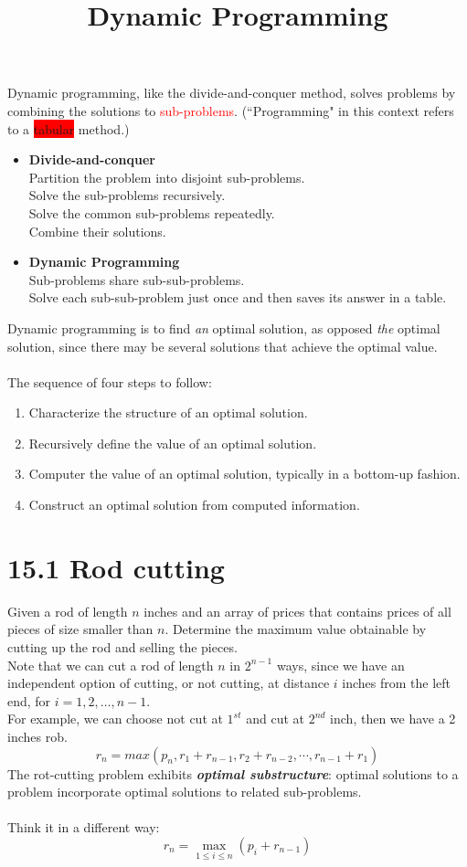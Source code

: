 \documentclass[a4paper]{article}
\title{Dynamic Programming}
\begin{document}
\maketitle

Dynamic programming, like the divide-and-conquer method, solves problems by combining the solutions to \textcolor{red}{sub-problems}. (``Programming" in this context refers to a \colorbox{red}{tabular} method.)\\
\begin{itemize}
    \item \textbf{Divide-and-conquer}\\
    Partition the problem into disjoint sub-problems.\\
    Solve the sub-problems recursively.\\
    Solve the common sub-problems repeatedly.\\
    Combine their solutions.
    \item \textbf{Dynamic Programming}\\
    Sub-problems share sub-sub-problems.\\
    Solve each sub-sub-problem just once and then saves its answer in a table.
\end{itemize}
Dynamic programming is to find \textit{an} optimal solution, as opposed \textit{the} optimal solution, since there may be several solutions that achieve the optimal value. 
\\
\\
The sequence of four steps to follow:
\begin{enumerate}
    \item Characterize the structure of an optimal solution.
    \item Recursively define the value of an optimal solution.
    \item Computer the value of an optimal solution, typically in a bottom-up fashion.
    \item Construct an optimal solution from computed information.
\end{enumerate}

\section*{15.1 Rod cutting}
Given a rod of length $n$ inches and an array of prices that contains prices of all pieces of size smaller than $n$. Determine the maximum value obtainable by cutting up the rod and selling the pieces.\\
Note that we can cut a rod of length $n$ in $2^{n-1}$ ways, since we have an independent option of cutting, or not cutting, at distance $i$ inches from the left end, for $i=1,2,\ldots, n-1$.\\ 
For example, we can choose not cut at $1^{st}$ and cut at $2^{nd}$ inch, then we have a 2 inches rob.
$$
r_n=max(p_n, r_1+r_{n-1}, r_2+r_{n-2},\cdots, r_{n-1}+r_{1})
$$
The rot-cutting problem exhibits \textbf{\textit{optimal substructure}}: optimal solutions to a problem incorporate optimal solutions to related sub-problems.\\
\\
Think it in a different way:
    $$r_n=\max_{1\leq i\leq n}(p_i+r_{n-1})$$
    
\end{document}

